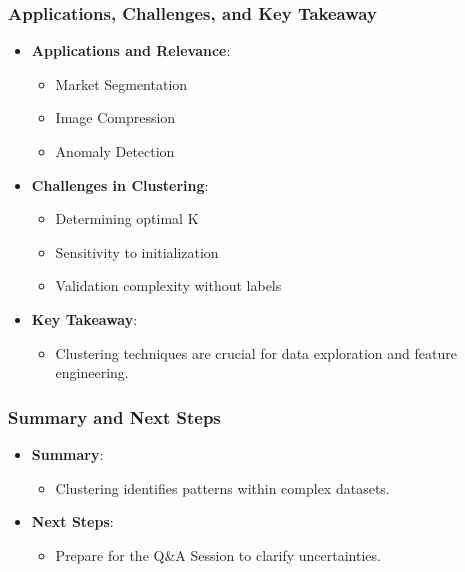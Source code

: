 \documentclass[aspectratio=169]{beamer}
\begin{document}
\begin{frame}[fragile]
    \frametitle{Applications, Challenges, and Key Takeaway}

    \begin{itemize}
        \item \textbf{Applications and Relevance}:
        \begin{itemize}
            \item Market Segmentation
            \item Image Compression
            \item Anomaly Detection
        \end{itemize}

        \item \textbf{Challenges in Clustering}:
        \begin{itemize}
            \item Determining optimal K
            \item Sensitivity to initialization
            \item Validation complexity without labels
        \end{itemize}

        \item \textbf{Key Takeaway}:
        \begin{itemize}
            \item Clustering techniques are crucial for data exploration and feature engineering.
        \end{itemize}
    \end{itemize}
\end{frame}

\begin{frame}[fragile]
    \frametitle{Summary and Next Steps}

    \begin{itemize}
        \item \textbf{Summary}:
        \begin{itemize}
            \item Clustering identifies patterns within complex datasets.
        \end{itemize}
        
        \item \textbf{Next Steps}:
        \begin{itemize}
            \item Prepare for the Q\&A Session to clarify uncertainties.
        \end{itemize}
    \end{itemize}
\end{frame}
\end{document}
